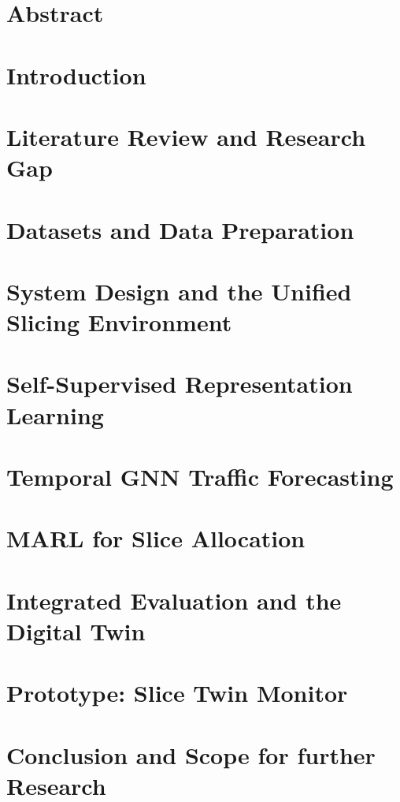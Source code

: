 \documentclass[a4paper, 12pt]{report}
\theoremstyle{definition}
\begin{document}
	

\newpage

\chapter*{Abstract}

\clearpage
{}
\setcounter{page}{1}
\chapter{Introduction}

\chapter{Literature Review and Research Gap}

\chapter{Datasets and Data Preparation}

\chapter{System Design and the Unified Slicing Environment}
 
\chapter{Self-Supervised Representation Learning}

\chapter{Temporal GNN Traffic Forecasting}

\chapter{MARL for Slice Allocation}

\chapter{Integrated Evaluation and the Digital Twin}

\chapter{Prototype: Slice Twin Monitor}

\chapter{Conclusion and Scope for further Research}

\appendix
\end{document}
